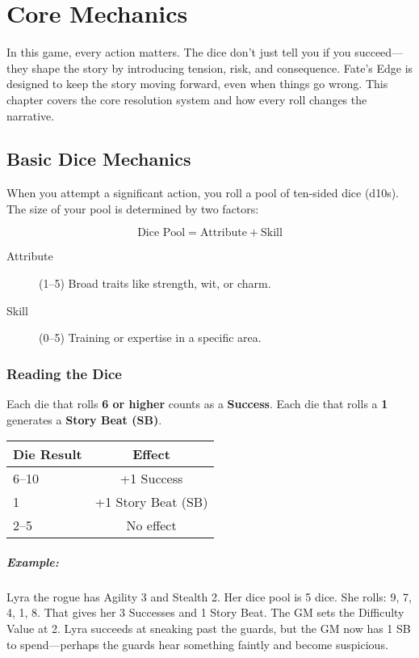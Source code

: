 \chapter{Core Mechanics} \label{ch:core-mechanics}

In this game, every action matters. The dice don't just tell you if you succeed—they shape the story by introducing tension, risk, and consequence. Fate's Edge is designed to keep the story moving forward, even when things go wrong. This chapter covers the core resolution system and how every roll changes the narrative.

\section{Basic Dice Mechanics} 

When you attempt a significant action, you roll a pool of ten-sided dice (d10s). The size of your pool is determined by two factors:

\[
\text{Dice Pool} = \text{Attribute} + \text{Skill}
\]

\begin{description}
  \item[Attribute] (1--5) Broad traits like strength, wit, or charm. 
  \item[Skill] (0--5) Training or expertise in a specific area. 
\end{description}

\subsection*{Reading the Dice}

Each die that rolls \textbf{6 or higher} counts as a \textbf{Success}.  
Each die that rolls a \textbf{1} generates a \textbf{Story Beat (SB)}.

\begin{center}
\small
\begin{tabular}{lc}
\toprule
\textbf{Die Result} & \textbf{Effect} \\
\midrule
6--10 & +1 Success \\
1 & +1 Story Beat (SB) \\
2--5 & No effect \\
\bottomrule
\end{tabular}
\end{center}

\paragraph{Example:}  
Lyra the rogue has Agility 3 and Stealth 2. Her dice pool is 5 dice. She rolls: 9, 7, 4, 1, 8. That gives her 3 Successes and 1 Story Beat. The GM sets the Difficulty Value at 2. Lyra succeeds at sneaking past the guards, but the GM now has 1 SB to spend—perhaps the guards hear something faintly and become suspicious.

